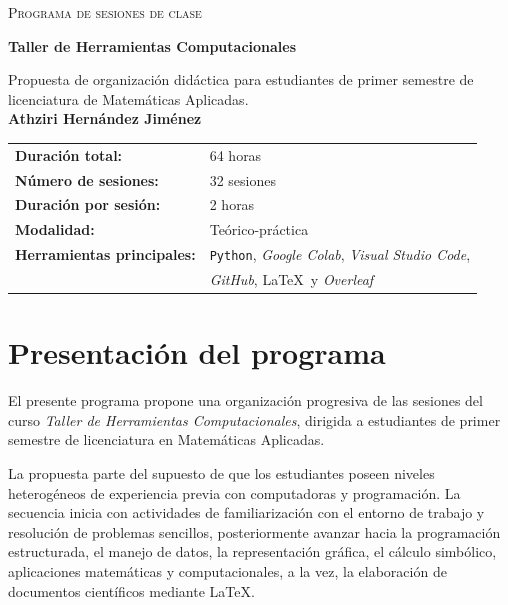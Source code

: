 \documentclass[12pt,letterpaper]{article}
\newcommand{\python}{\texttt{Python}}
\newcommand{\latexname}{\LaTeX}
\newcommand{\colab}{\textit{Google Colab}}
\newcommand{\vscode}{\textit{Visual Studio Code}}
\newcommand{\github}{\textit{GitHub}}
\newcommand{\overleaf}{\textit{Overleaf}}
\begin{document}
\begin{titlepage}
\centering

{\scshape\LARGE Programa de sesiones de clase\par}

\vspace{1cm}

{\Huge\bfseries Taller de Herramientas Computacionales\par}

\vspace{0.5cm}

{\Large Propuesta de organización didáctica para estudiantes de primer semestre de licenciatura de Matemáticas Aplicadas.}
\\[3ex]
{\large \textbf{Athziri Hernández Jiménez}}

\vfill

\begin{tabular}{|ll|} \hline
\textbf{Duración total:} & 64 horas \\
\textbf{Número de sesiones:} & 32 sesiones \\
\textbf{Duración por sesión:} & 2 horas \\
\textbf{Modalidad:} & Teórico-práctica \\
\textbf{Herramientas principales:} &
\python, \colab, \vscode,\\ & \github, \latexname\ y \overleaf\\ \hline 
\end{tabular}

\vfill

\end{titlepage}

\tableofcontents
\newpage

\section{Presentación del programa}

El presente programa propone una organización progresiva de las sesiones
del curso \textit{Taller de Herramientas Computacionales}, dirigida a
estudiantes de primer semestre de licenciatura en Matemáticas Aplicadas.

La propuesta parte del supuesto de que los estudiantes poseen niveles
heterogéneos de experiencia previa con computadoras y programación.
La secuencia inicia con actividades de familiarización
con el entorno de trabajo y resolución de problemas sencillos, posteriormente avanzar hacia la programación estructurada, el manejo de
datos, la representación gráfica, el cálculo simbólico, aplicaciones
matemáticas y computacionales, a la vez, la elaboración de documentos científicos mediante \latexname. 
\end{document}
